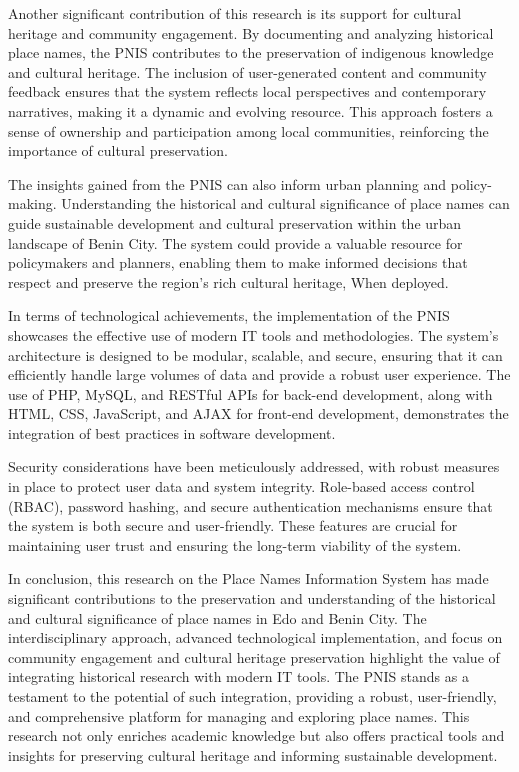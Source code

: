 Another significant contribution of this research is its support for cultural heritage and community engagement. By documenting and analyzing historical place names, the PNIS contributes to the preservation of indigenous knowledge and cultural heritage. The inclusion of user-generated content and community feedback ensures that the system reflects local perspectives and contemporary narratives, making it a dynamic and evolving resource. This approach fosters a sense of ownership and participation among local communities, reinforcing the importance of cultural preservation.

The insights gained from the PNIS can also inform urban planning and policy-making. Understanding the historical and cultural significance of place names can guide sustainable development and cultural preservation within the urban landscape of Benin City. The system could provide a valuable resource for policymakers and planners, enabling them to make informed decisions that respect and preserve the region’s rich cultural heritage, When deployed.

In terms of technological achievements, the implementation of the PNIS showcases the effective use of modern IT tools and methodologies. The system's architecture is designed to be modular, scalable, and secure, ensuring that it can efficiently handle large volumes of data and provide a robust user experience. The use of PHP, MySQL, and RESTful APIs for back-end development, along with HTML, CSS, JavaScript, and AJAX for front-end development, demonstrates the integration of best practices in software development.

Security considerations have been meticulously addressed, with robust measures in place to protect user data and system integrity. Role-based access control (RBAC), password hashing, and secure authentication mechanisms ensure that the system is both secure and user-friendly. These features are crucial for maintaining user trust and ensuring the long-term viability of the system.

In conclusion, this research on the Place Names Information System has made significant contributions to the preservation and understanding of the historical and cultural significance of place names in Edo and Benin City. The interdisciplinary approach, advanced technological implementation, and focus on community engagement and cultural heritage preservation highlight the value of integrating historical research with modern IT tools. The PNIS stands as a testament to the potential of such integration, providing a robust, user-friendly, and comprehensive platform for managing and exploring place names. This research not only enriches academic knowledge but also offers practical tools and insights for preserving cultural heritage and informing sustainable development.